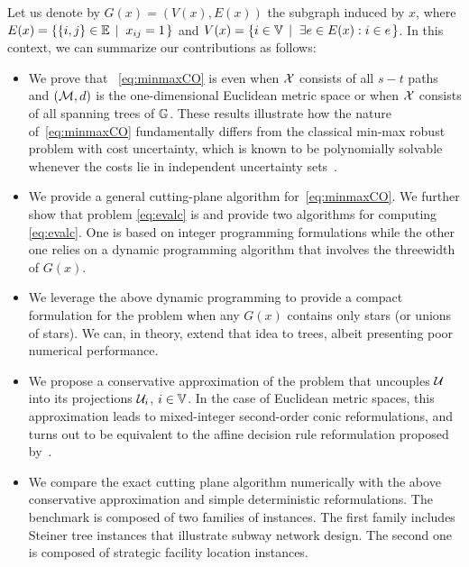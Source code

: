 \documentclass[12pt]{article}
\newcommand{\blue}[1]{{\color{black}#1}}
\begin{document}
\blue{Let us denote by $G(x)=(V(x),E(x))$ the subgraph induced by $x$, where $E(x)=\left\{\{i,j\}\in \mathbb{E} \; \left|\;\; x_{ij}=1 \right.\right\}$ and $V(x)=\left\{i\in \mathbb{V} \; \left|\;\; \exists e \in E(x):i\in e \right.\right\}$}.
In this context, we can summarize our contributions as follows:
\begin{itemize}
\item We prove that ~\ref{eq:minmaxCO} is \NPH even when \blue{$\mathcal{X}$} consists of all $s-t$ paths and $(\mathcal{M},d)$ is the one-dimensional Euclidean metric space or when \blue{$\mathcal{X}$} consists of all spanning trees of $\mathbb{G}$. These results illustrate how the nature of~\ref{eq:minmaxCO} fundamentally differs from the classical min-max robust problem with cost uncertainty, which is known to be polynomially solvable whenever the costs lie in independent uncertainty sets~\citep{AissiBV09}.
 
\item We provide a general cutting-plane algorithm for~\ref{eq:minmaxCO}. We further show that problem \ref{eq:evalc} is \NPH and provide two algorithms for computing \ref{eq:evalc}. One is based on integer programming formulations while the other one relies on a dynamic programming algorithm that involves the threewidth of \blue{$G(x)$}.

\item We leverage the above dynamic programming to provide a compact formulation for the problem when any \blue{$G(x)$} contains only stars (or unions of stars). We can, in theory, extend that idea to trees, albeit presenting poor numerical performance.

\item We propose a conservative approximation of the problem that uncouples $\mathcal{U}$ into its projections $\mathcal{U}_i$, $i\in \mathbb{V}$. In the case of Euclidean metric spaces, this approximation leads to mixed-integer second-order conic reformulations, and turns out to be equivalent to the affine decision rule reformulation proposed by~\cite{zhen2021robust}.
 
\item We compare the exact cutting plane algorithm numerically with the above conservative approximation and simple deterministic reformulations. The benchmark is composed of two families of instances. 
The first family includes Steiner tree instances that illustrate subway network design. 
The second one is composed of strategic facility location instances.
\end{itemize}
\end{document}
